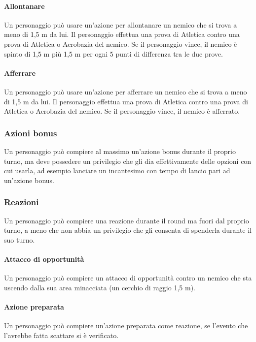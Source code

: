 \paragraph{Allontanare}
Un personaggio può usare un'azione per allontanare un nemico che si trova a meno di 1,5 m da lui. Il personaggio effettua una prova di Atletica contro una prova di Atletica o Acrobazia del nemico. Se il personaggio vince, il nemico è spinto di 1,5 m più 1,5 m per ogni 5 punti di differenza tra le due prove.\\
\paragraph{Afferrare}
Un personaggio può usare un'azione per afferrare un nemico che si trova a meno di 1,5 m da lui. Il personaggio effettua una prova di Atletica contro una prova di Atletica o Acrobazia del nemico. Se il personaggio vince, il nemico è afferrato.\\

\subsubsection{Azioni bonus}
Un personaggio può compiere al massimo un'azione bonus durante il proprio turno, ma deve possedere un privilegio che gli dia effettivamente delle opzioni con cui usarla, ad esempio lanciare un incantesimo con tempo di lancio pari ad un'azione bonus.\\

\subsubsection{Reazioni}
Un personaggio può compiere una reazione durante il round ma fuori dal proprio turno, a meno che non abbia un privilegio che gli consenta di spenderla durante il suo turno.\\
\paragraph{Attacco di opportunità}
Un personaggio può compiere un attacco di opportunità contro un nemico che sta uscendo dalla sua area minacciata (un cerchio di raggio 1,5 m).\\
\paragraph{Azione preparata}
Un personaggio può compiere un'azione preparata come reazione, se l'evento che l'avrebbe fatta scattare si è verificato.\\